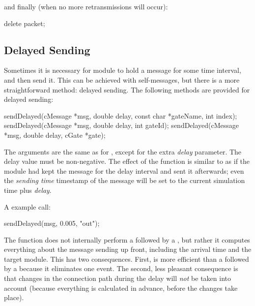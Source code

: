 and finally (when no more retransmissions will occur):

\begin{cpp}
delete packet;
\end{cpp}


\subsection{Delayed Sending}
\label{sec:simple-modules:delayed-sending}

Sometimes it is necessary for module to hold a message for some time interval,
and then send it. This can be achieved with self-messages, but there is a
more straightforward method: delayed sending. The
following methods are provided for delayed sending:

\begin{cpp}
sendDelayed(cMessage *msg, double delay, const char *gateName, int index);
sendDelayed(cMessage *msg, double delay, int gateId);
sendDelayed(cMessage *msg, double delay, cGate *gate);
\end{cpp}

The arguments are the same as for , except for the extra
\textit{delay} parameter. The delay value must be non-negative.
The effect of the function is similar to as if the module
had kept the message for the delay interval and sent it afterwards;
even the \textit{sending time} timestamp of the message will be set to
the current simulation time plus \textit{delay}.

A example call:

\begin{cpp}
sendDelayed(msg, 0.005, "out");
\end{cpp}

The  function does not internally perform a
 followed by a , but rather it computes
everything about the message sending up front, including the arrival time
and the target module. This has two consequences. First,
 is more efficient than a 
followed by a  because it eliminates one event. The second, less
pleasant consequence is that changes in the connection path during the
delay will \textit{not} be taken into account (because everything is
calculated in advance, before the changes take place).


